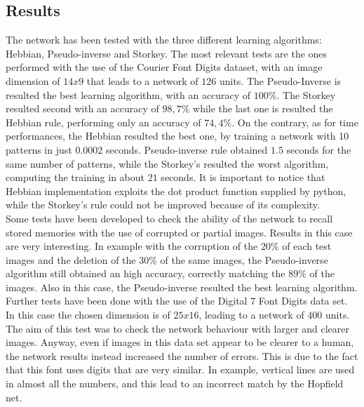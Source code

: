 \documentclass[letterpaper,twocolumn,10pt]{article}
\begin{document}
\subsection{Results}
The network has been tested with the three different learning algorithms: Hebbian, Pseudo-inverse and Storkey. The most relevant tests are the ones performed with the use of the Courier Font Digits dataset, with an image dimension of $14x9$ that leads to a network of $126$ units. The Pseudo-Inverse is resulted the best learning algorithm, with an accuracy of $100\%$. The Storkey resulted second with an accuracy of $98,7\%$ while the last one is resulted the Hebbian rule, performing only an accuracy of $74,4\%$. On the contrary, as for time performances, the Hebbian resulted the best one, by training a network with 10 patterns in just $0.0002$ seconds. Pseudo-inverse rule obtained $1.5$ seconds for the same number of patterns, while the Storkey's resulted the worst algorithm, computing the training in about $21$ seconds. It is important to notice that Hebbian implementation exploits the dot product function supplied by python, while the Storkey's rule could not be improved because of its complexity.\\

Some tests have been developed to check the ability of the network to recall stored memories with the use of corrupted or partial images. Results in this case are very interesting. In example with the corruption of the $20\%$ of each test images and the deletion of the $30\%$ of the same images, the Pseudo-inverse algorithm still obtained an high accuracy, correctly matching the $89\%$ of the images. Also in this case, the Pseudo-inverse resulted the best learning algorithm.\\

Further tests have been done with the use of the Digital 7 Font Digits data set. In this case the chosen dimension is of $25x16$, leading to a network of $400$ units. The aim of this test was to check the network behaviour with larger and clearer images. Anyway, even if images in this data set appear to be clearer to a human, the network results instead increased the number of errors. This is due to the fact that this font uses digits that are very similar. In example, vertical lines are used in almost all the numbers, and this lead to an incorrect match by the Hopfield net.\\ 
\end{document}

